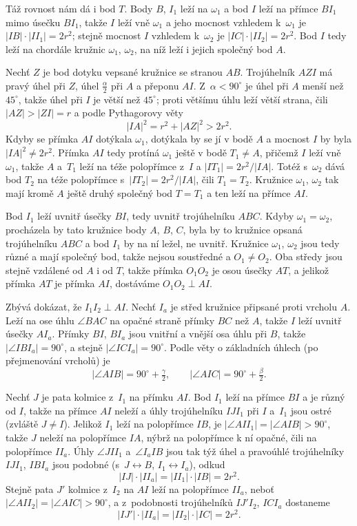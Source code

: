 {    Táž rovnost nám dá i bod $T$. Body $B$, $I_1$ leží na $\omega_1$ a bod $I$ leží na přímce $BI_1$ mimo úsečku $BI_1$, takže $I$ leží vně $\omega_1$ a jeho mocnost vzhledem k~$\omega_1$ je $|IB| \cdot |II_1| = 2r^2$; stejně mocnost $I$ vzhledem k~$\omega_2$ je $|IC| \cdot |II_2| = 2r^2$. Bod $I$ tedy leží na chordále kružnic $\omega_1$, $\omega_2$, na níž leží i jejich společný bod $A$.

    Nechť $Z$ je bod dotyku vepsané kružnice se stranou $AB$. Trojúhelník $AZI$ má pravý úhel při $Z$, úhel $\frac\alpha2$ při $A$ a přeponu $AI$. Z~$\alpha < 90^\circ$ je úhel při $A$ menší než $45^\circ$, takže úhel při $I$ je větší než $45^\circ$; proti většímu úhlu leží větší strana, čili $|AZ| > |ZI| = r$ a podle Pythagorovy věty
    $$
    |IA|^2 = r^2 + |AZ|^2 > 2r^2.
    $$
    Kdyby se přímka $AI$ dotýkala $\omega_1$, dotýkala by se jí v bodě $A$ a mocnost $I$ by byla $|IA|^2 \neq 2r^2$. Přímka $AI$ tedy protíná $\omega_1$ ještě v bodě $T_1 \neq A$, přičemž $I$ leží vně $\omega_1$, takže $A$ a~$T_1$ leží na téže polopřímce z~$I$ a $|IT_1| = 2r^2/|IA|$. Totéž s~$\omega_2$ dává bod $T_2$ na téže polopřímce s~$|IT_2| = 2r^2/|IA|$, čili $T_1 = T_2$. Kružnice $\omega_1$, $\omega_2$ tak mají kromě $A$ ještě druhý společný bod $T = T_1$ a ten leží na přímce $AI$.

    Bod $I_1$ leží uvnitř úsečky $BI$, tedy uvnitř trojúhelníku $ABC$. Kdyby $\omega_1 = \omega_2$, procházela by tato kružnice body $A$, $B$, $C$, byla by to kružnice opsaná trojúhelníku $ABC$ a bod $I_1$ by na ní ležel, ne uvnitř. Kružnice $\omega_1$, $\omega_2$ jsou tedy různé a mají společný bod, takže nejsou soustředné a $O_1 \neq O_2$. Oba středy jsou stejně vzdálené od $A$ i od $T$, takže přímka $O_1O_2$ je osou úsečky $AT$, a jelikož přímka $AT$ je přímka $AI$, dostáváme $O_1O_2 \perp AI$.

    Zbývá dokázat, že $I_1I_2 \perp AI$. Nechť $I_a$ je střed kružnice připsané proti vrcholu $A$. Leží na ose úhlu $\angle BAC$ na opačné straně přímky $BC$ než $A$, takže $I$ leží uvnitř úsečky $AI_a$. Přímky $BI$, $BI_a$ jsou vnitřní a vnější osa úhlu při $B$, takže $|\angle IBI_a| = 90^\circ$, a stejně $|\angle ICI_a| = 90^\circ$. Podle věty o základních úhlech (po přejmenování vrcholů) je
    $$
    |\angle AIB| = 90^\circ + \tfrac\gamma2, \qquad |\angle AIC| = 90^\circ + \tfrac\beta2.
    $$

    Nechť $J$ je pata kolmice z~$I_1$ na přímku $AI$. Bod $I_1$ leží na přímce $BI$ a je různý od $I$, takže na přímce $AI$ neleží a úhly trojúhelníku $IJI_1$ při $I$ a~$I_1$ jsou ostré (zvláště $J \neq I$). Jelikož $I_1$ leží na polopřímce $IB$, je $|\angle AII_1| = |\angle AIB| > 90^\circ$, takže $J$ neleží na polopřímce $IA$, nýbrž na polopřímce k ní opačné, čili na polopřímce $II_a$. Úhly $\angle JII_1$ a~$\angle I_aIB$ jsou tak týž úhel a pravoúhlé trojúhelníky $IJI_1$, $IBI_a$ jsou podobné (s~$J \leftrightarrow B$, $I_1 \leftrightarrow I_a$), odkud
    $$
    |IJ| \cdot |II_a| = |II_1| \cdot |IB| = 2r^2.
    $$
    Stejně pata $J'$ kolmice z~$I_2$ na $AI$ leží na polopřímce $II_a$, neboť $|\angle AII_2| = |\angle AIC| > 90^\circ$, a z~podobnosti trojúhelníků $IJ'I_2$, $ICI_a$ dostaneme
    $$
    |IJ'| \cdot |II_a| = |II_2| \cdot |IC| = 2r^2.
    $$

}
